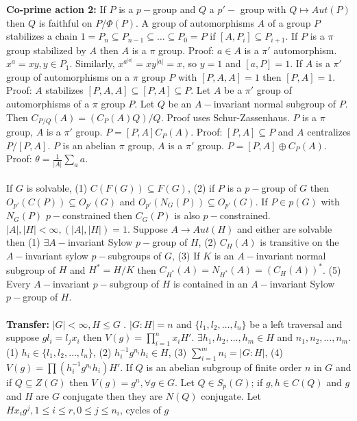 {\bf Co-prime action 2:}
If $P$ is a $p-$group and $Q$ a $p'-$ group with $Q \mapsto Aut(P)$ then
$Q$ is faithful on $P/\Phi(P)$.
A group of automorphisms $A$ of a group $P$ stabilizes a chain
$1=P_n \subseteq P_{n-1} \subseteq \ldots \subseteq P_0 = P$ if
$[A,P_i] \subseteq P_{i+1}$.  If $P$ is a $\pi$ group stabilized by
$A$ then $A$ is a $\pi$ group.  Proof: $a \in A$ is a $\pi'$ automorphism.
$x^a =xy, y \in P_1$.  Similarly, $x^{a^{|a|}}= x y^{|a|}=x$, so $y=1$ and
$[a,P]=1$.
If $A$ is a $\pi'$ group of automorphisms on a $\pi$ group $P$ with
$[P,A,A]=1$ then $[P,A]=1$.  Proof:  $A$ stabilizes
$[P,A,A] \subseteq [P,A] \subseteq P$.
Let $A$ be a $\pi'$ group of automorphisms of a $\pi$ group $P$.  Let $Q$ be
an $A-$invariant normal subgroup of $P$.  Then $C_{P/Q}(A)= (C_P(A) Q)/Q$.  Proof
uses Schur-Zassenhaus.
$P$ is a $\pi$ group, $A$ is a $\pi'$ group.  $P= [P,A] C_P(A)$.  Proof:
$[P,A] \subseteq P$ and $A$ centralizes $P/[P,A]$.
$P$ is an abelian $\pi$ group, $A$ is a $\pi'$ group.  $P= [P,A] \oplus C_P(A)$.  Proof:
$\theta= {\frac 1 {|A|}} \sum_a a$.\\
\\
If $G$ is solvable, (1) $C(F(G)) \subseteq F(G)$, (2) if $P$ is a $p-$group
of $G$ then $O_{p'}(C(P)) \subseteq O_{p'}(G)$ and $O_{p'}(N_G(P)) \subseteq O_{p'}(G)$.
If $P \in p(G)$ with $N_G(P)$ $p-$constrained then $C_G(P)$ is also $p-$constrained.
$|A|, |H| < \infty, (|A|, |H|)=1$.  Suppose $A \rightarrow Aut(H)$ and either are
solvable then (1) $\exists A-$invariant Sylow $p-$group of $H$, 
(2) $C_H(A)$ is transitive on the $A-$invariant sylow $p-$subgroups of $G$,
(3) If $K$ is an $A-$invariant normal subgroup of $H$ and $H^*=H/K$ then
$C_{H^*}(A)= N_{H^*}(A)=(C_H(A))^*$. (5) Every $A-$invariant
$p-$subgroup of $H$ is contained in an $A-$invariant Sylow $p-$group of $H$.\\
\\
{\bf Transfer:} $|G|< \infty, H \le G$ .
$|G:H|=n$ and
$\{ l_1 , l_2 , \ldots , l_n \}$ be a left traversal and suppose
$gl_i= l_j x_i$ then $V(g)= \prod_{i=1}^n x_i H'$.
$\exists h_1 , h_2 , \ldots , h_m \in H$ and  $n_1 , n_2 , \ldots , n_m$. 
(1) $h_i \in \{ l_1 , l_2 , \ldots , l_n \}$,
(2) $h_i^{-1} g^{n_i} h_i \in H$,
(3) $\sum_{i=1}^m n_i = |G:H|$,
(4) $V(g)= \prod (h_i^{-1} g^{n_i} h_i ) H'$.
If $Q$ is an abelian subgroup of finite order $n$ in $G$ and if $Q \subseteq Z(G)$ then
$V(g)= g^n, \forall g \in G$.  Let $Q \in S_p(G)$; if $g,h \in C(Q)$ and $g$ and $H$ are
$G$ conjugate then they are $N(Q)$ conjugate.
Let $Hx_i g^j, 1 \le i \le r, 0 \le j \le n_i$, cycles of $g$ 
